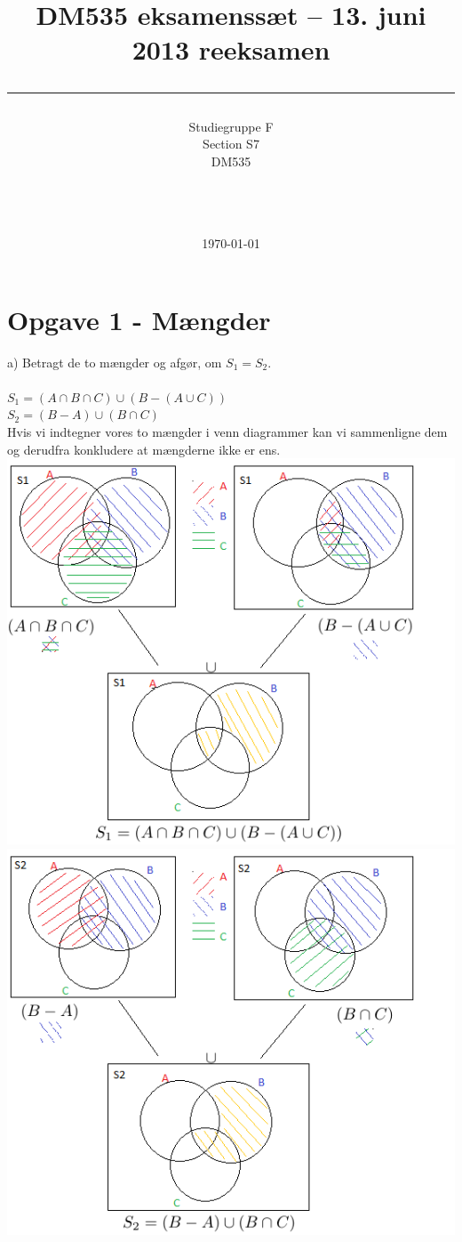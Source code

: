 \documentclass[a4paper,10pt]{article}
\title{DM535 eksamenssæt -- 13. juni 2013 reeksamen \\ \rule{10cm}{0.5mm}}
\author{Studiegruppe F \\ Section S7 \\
DM535\\\rule{5.5cm}{0.5mm}\\}
\date{\today}
\begin{document}
\maketitle

\vfill

\tableofcontents

\newpage

\section{Opgave 1 - Mængder}
a) Betragt de to mængder og afgør, om $S_1 = S_2$.\\\\
$S_1 = (A \cap B \cap C) \cup (B - (A \cup C))$\\
$S_2 = (B - A) \cup (B \cap C)$\\
Hvis vi indtegner vores to mængder i venn diagrammer kan vi sammenligne dem og derudfra konkludere at mængderne ikke er ens. \\
\includegraphics[scale=1]{VennDiagram1.png} 
\includegraphics[scale=1]{VennDiagram2.png} 
\end{document}
